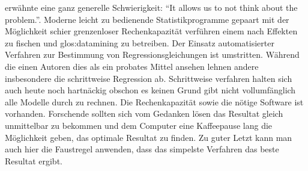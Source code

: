  erwähnte eine ganz generelle Schwierigkeit: ``It allows us to not think about the problem.''.
Moderne leicht zu bedienende Statistikprogramme gepaart mit der Möglichkeit schier grenzenloser Rechenkapazität verführen einem nach Effekten zu fischen und \gls{glos:datamining} zu betreiben.
Der Einsatz automatisierter Verfahren zur Bestimmung von Regressionsgleichungen ist umstritten. 
Während die einen Autoren dies als ein probates Mittel ansehen lehnen andere insbesondere die schrittweise Regression ab. 
Schrittweise verfahren halten sich auch heute noch hartnäckig obschon es keinen Grund gibt nicht vollumfänglich alle Modelle durch zu rechnen. 
Die Rechenkapazität sowie die nötige Software ist vorhanden. 
Forschende sollten sich vom Gedanken lösen das Resultat gleich unmittelbar zu bekommen und dem Computer eine Kaffeepause lang die Möglichkeit geben, das optimale Resultat zu finden.
Zu guter Letzt kann man auch hier die Faustregel anwenden, dass das simpelste Verfahren das beste Resultat ergibt.